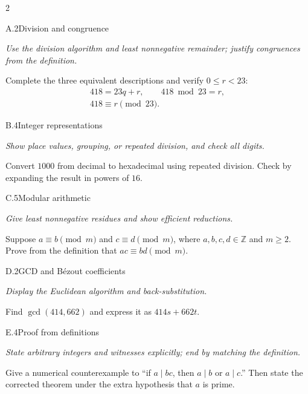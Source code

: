 \documentclass[9pt]{extarticle}
\begin{document}
\begin{multicols}{2}
\begin{CoreProblem}{A.2}{Division and congruence}
{\scriptsize\textit{Use the division algorithm and least nonnegative remainder; justify congruences from the definition.}\par}
Complete the three equivalent descriptions and verify $0\le r<23$:
\[
\begin{gathered}
418=23q+r,\qquad 418\bmod 23=r,\\
418\equiv r\pmod{23}.
\end{gathered}
\]
\end{CoreProblem}
\begin{CoreProblem}{B.4}{Integer representations}
{\scriptsize\textit{Show place values, grouping, or repeated division, and check all digits.}\par}
Convert $1000$ from decimal to hexadecimal using repeated division. Check by
expanding the result in powers of $16$.
\end{CoreProblem}
\begin{CoreProblem}{C.5}{Modular arithmetic}
{\scriptsize\textit{Give least nonnegative residues and show efficient reductions.}\par}
Suppose $a\equiv b\pmod m$ and $c\equiv d\pmod m$, where
$a,b,c,d\in\mathbb Z$ and $m\ge2$. Prove from the definition that
$ac\equiv bd\pmod m$.
\end{CoreProblem}
\columnbreak
\begin{CoreProblem}{D.2}{GCD and B\'ezout coefficients}
{\scriptsize\textit{Display the Euclidean algorithm and back-substitution.}\par}
Find $\gcd(414,662)$ and express it as $414s+662t$.
\end{CoreProblem}
\begin{CoreProblem}{E.4}{Proof from definitions}
{\scriptsize\textit{State arbitrary integers and witnesses explicitly; end by matching the definition.}\par}
Give a numerical counterexample to ``if $a\mid bc$, then $a\mid b$ or
$a\mid c$.'' Then state the corrected theorem under the extra hypothesis that
$a$ is prime.
\end{CoreProblem}
\end{multicols}
\CoreWorkArea
\FormBreak
{}
\end{document}

